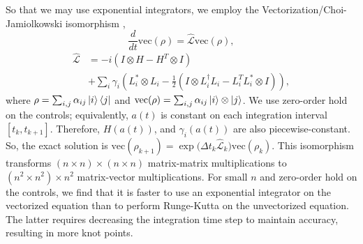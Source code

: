 So that we may use exponential integrators, we employ
the Vectorization/Choi-Jamiolkowski isomorphism \cite{Landi2018},
\begin{equation}
  \frac{d}{dt} \textrm{vec}({\rho}) = \hat{\mathcal{L}} \textrm{vec}({\rho}),
\end{equation}
\begin{equation}
  \begin{aligned}
    \hat{\mathcal{L}} &= -i(I \otimes H - H^{T} \otimes I)\\
    &+ \sum_{i} \gamma_{i}
    (L_{i}^{*} \otimes L_{i} - \frac{1}{2} (I \otimes L_{i}^{\dagger}L_{i}
    - L_{i}^{T}L_{i}^{*} \otimes I)),
  \end{aligned}
\end{equation}
where $\rho = \sum_{i, j} \alpha_{ij} \ket{i}\bra{j}$
and $\textrm{vec}(\rho) = \sum_{i, j} \alpha_{ij} \ket{i} \otimes \ket{j}$.
We use zero-order hold on the controls; equivalently, $a(t)$ is constant
on each integration interval $[t_{k}, t_{k + 1}]$. Therefore,
$H(a(t))$, and $\gamma_{i}(a(t))$ are also piecewise-constant.
So, the exact solution is
$\textrm{vec}(\rho_{k + 1}) = {\exp}{\textstyle(}\Delta t_{k}
\hat{\mathcal{L}}_{k}{\textstyle)} \textrm{vec}(\rho_{k})$.
This isomorphism transforms $(n \times n) \times (n \times n)$
matrix-matrix multiplications to $(n^{2} \times n^{2}) \times n^{2}$ matrix-vector
multiplications. For small $n$ and zero-order hold on the controls, we find that it is
faster to use an exponential integrator on the vectorized equation than to perform
Runge-Kutta on the unvectorized equation. The latter requires decreasing the integration
time step to maintain accuracy, resulting in more knot points.
